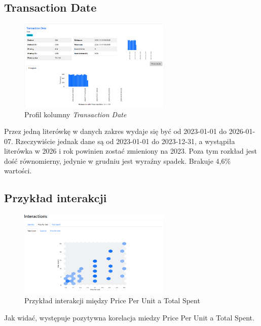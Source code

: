 \documentclass[a4paper,12pt]{article}
\begin{document}
\subsection{Transaction Date}

\begin{figure}[H]
  \centering
  \includegraphics[width=0.65\textwidth]{images/py_8.png}
  \caption{Profil kolumny \textit{Transaction Date}}
\end{figure}

Przez jedną literówkę w danych zakres wydaje się być od 2023-01-01 do 2026-01-07. Rzeczywiście jednak dane są od 2023-01-01 do 2023-12-31, a wystąpiła literówka w 2026 i rok powinien zostać zmieniony na 2023. Poza tym rozkład jest dość równomierny, jedynie w grudniu jest wyraźny spadek. Brakuje 4,6\% wartości.

\subsection{Przykład interakcji}

\begin{figure}[H]
  \centering
  \includegraphics[width=0.65\textwidth]{images/py_interactions_example.png}
  \caption{Przykład interakcji między Price Per Unit a Total Spent}
\end{figure}

Jak widać, występuje pozytywna korelacja miedzy Price Per Unit a Total Spent.

\printbibliography
\end{document}
